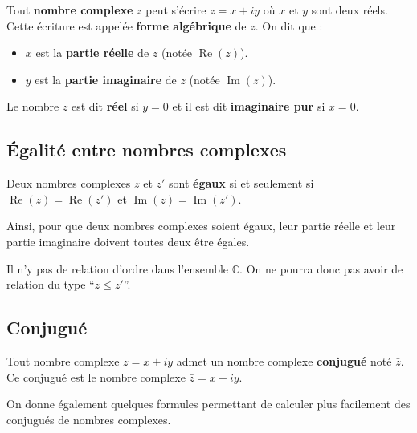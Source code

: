 	\begin{formula}
		Tout \textbf{nombre complexe} $z$ peut s'écrire $z = x+iy$ où $x$ et $y$ sont deux réels. Cette écriture est appelée \textbf{forme algébrique} de $z$. On dit que :
		\begin{itemize}
			\item $x$ est la \textbf{partie réelle} de $z$ (notée $\operatorname{Re}(z)$).
			\item $y$ est la \textbf{partie imaginaire} de $z$ (notée $\operatorname{Im}(z)$).
		\end{itemize}
	\end{formula}

	\begin{tip}
		Le nombre $z$ est dit \textbf{réel} si $y = 0$ et il est dit \textbf{imaginaire pur} si $x = 0$.
	\end{tip}

	\subsection{Égalité entre nombres complexes}
	\label{egalite}

	\begin{formula}
		Deux nombres complexes $z$ et $z'$ sont \textbf{égaux} si et seulement si $\operatorname{Re}(z) = \operatorname{Re}(z')$ et $\operatorname{Im}(z) = \operatorname{Im}(z')$.
	\end{formula}

	Ainsi, pour que deux nombres complexes soient égaux, leur partie réelle et leur partie imaginaire doivent toutes deux être égales.

	\begin{tip}[Attention !]
		Il n'y pas de relation d'ordre dans l'ensemble $\mathbb{C}$. On ne pourra donc pas avoir de relation du type ``$z \leq z'$''.
	\end{tip}

	\subsection{Conjugué}

	\begin{formula}[Définition]
		Tout nombre complexe $z = x+iy$ admet un nombre complexe \textbf{conjugué} noté $\bar{z}$. Ce conjugué est le nombre complexe $\bar{z} = x-iy$.
	\end{formula}

	On donne également quelques formules permettant de calculer plus facilement des conjugués de nombres complexes.

